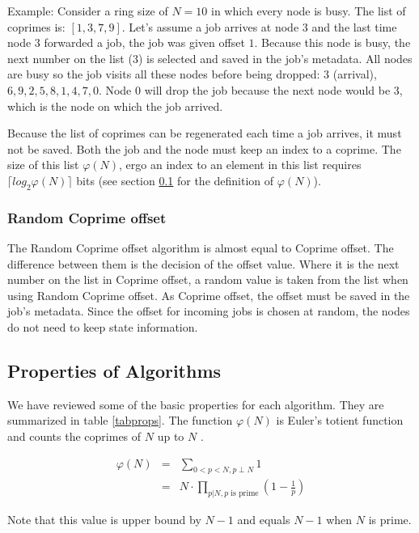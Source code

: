 \documentclass[10pt,a4paper]{article}
\begin{document}
Example:
Consider a ring size of $N=10$ in which every node is busy. The list of coprimes is: $[1, 3, 7, 9]$. Let's assume a job arrives at node $3$ and the last time node $3$ forwarded a job, the job was given offset $1$.
Because this node is busy, the next number on the list ($3$) is selected and saved in the job's metadata. All nodes are busy so the job visits all these nodes before being dropped: $3$ (arrival), $6, 9, 2, 5, 8, 1, 4, 7, 0$. Node $0$ will drop the job because the next node would be $3$, which is the node on which the job arrived.

Because the list of coprimes can be regenerated each time a job arrives, it must not be saved. Both the job and the node must keep an index to a coprime. The size of this list $\varphi(N)$, ergo an index to an element in this list requires $\lceil log_2 \varphi(N) \rceil$ bits (see section \ref{secprops} for the definition of $\varphi(N)$).

\subsubsection*{Random Coprime offset}
The Random Coprime offset algorithm is almost equal to Coprime offset. The difference between them is the decision of the offset value. Where it is the next number on the list in Coprime offset, a random value is taken from the list when using Random Coprime offset. As Coprime offset, the offset must be saved in the job's metadata. Since the offset for incoming jobs is chosen at random, the nodes do not need to keep state information.

\subsection{Properties of Algorithms}
\label{secprops}

We have reviewed some of the basic properties for each algorithm. They are summarized in table \ref{tabprops}. The function $\varphi(N)$ is Euler's totient function and counts the coprimes of $N$ up to $N$ \cite{EULER}.

\begin{eqnarray}
\varphi(N) &=& \sum_{0 < p < N, p \perp N} 1 \nonumber \\
&=&  N \cdot \prod_{p|N, p\text{ is prime}} (1-\frac{1}{p}) \nonumber
\end{eqnarray}

Note that this value is upper bound by $N-1$ and equals $N-1$ when $N$ is prime.
\end{document}

